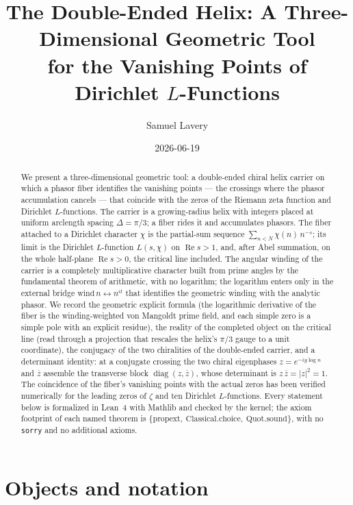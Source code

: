 \documentclass[11pt]{article}
\title{The Double-Ended Helix: A Three-Dimensional Geometric Tool\\
for the Vanishing Points of Dirichlet $L$-Functions}
\author{Samuel Lavery}
\date{2026-06-19}
\DeclareMathOperator{\Ree}{Re}
\DeclareMathOperator{\diag}{diag}
\newcommand{\conj}[1]{\overline{#1}}
\newcommand{\code}[1]{\texttt{#1}}
\begin{document}
\maketitle

\begin{abstract}
We present a three-dimensional geometric tool: a double-ended chiral helix carrier on which a
phasor fiber identifies the vanishing points --- the crossings where the phasor accumulation
cancels --- that coincide with the zeros of the Riemann zeta function and Dirichlet $L$-functions. The carrier is a growing-radius helix with
integers placed at uniform arclength spacing $\Delta=\pi/3$; a fiber rides it and accumulates
phasors. The fiber attached to a Dirichlet character $\chi$ is the
partial-sum sequence $\sum_{n<N}\chi(n)\,n^{-s}$; its limit is the Dirichlet $L$-function
$L(s,\chi)$ on $\Ree s>1$, and, after Abel summation, on the whole half-plane $\Ree s>0$,
the critical line included. The angular winding of the carrier is a completely multiplicative
character built from prime angles by the fundamental theorem of arithmetic, with no logarithm;
the logarithm enters only in the external bridge $\mathrm{wind}\,n\leftrightarrow n^{it}$ that
identifies the geometric winding with the analytic phasor. We record the geometric explicit
formula (the logarithmic derivative of the fiber is the winding-weighted von Mangoldt prime
field, and each simple zero is a simple pole with an explicit residue), the reality of the
completed object on the critical line (read through a projection that rescales the helix's $\pi/3$
gauge to a unit coordinate), the conjugacy of the two chiralities of the double-ended carrier, and a
determinant identity: at a conjugate crossing the two chiral eigenphases
$z=e^{-iy\log n}$ and $\conj{z}$ assemble the transverse block $\diag(z,\conj z)$, whose
determinant is $z\,\conj z=|z|^2=1$. The coincidence of the fiber's vanishing points with the
actual zeros has been verified numerically for the leading zeros of $\zeta$ and ten Dirichlet
$L$-functions. Every statement below is formalized in Lean~4 with
Mathlib and checked by the kernel; the axiom footprint of each named theorem is
$\{\mathrm{propext},\ \mathrm{Classical.choice},\ \mathrm{Quot.sound}\}$, with no \code{sorry}
and no additional axioms.
\end{abstract}

\tableofcontents

\section{Objects and notation}\label{sec:notation}
\end{document}
